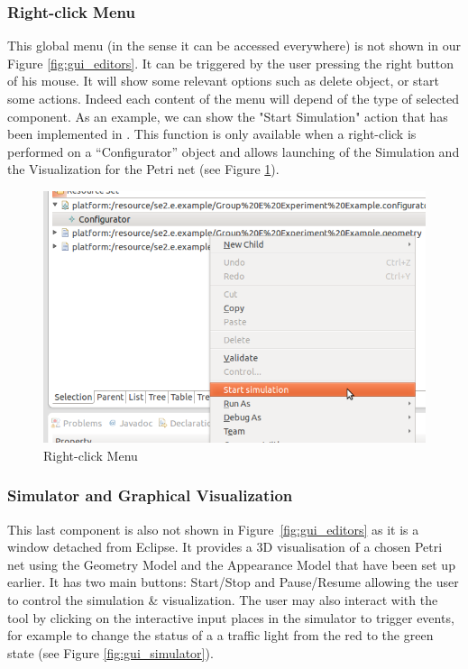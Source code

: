 \subsubsection{Right-click Menu}
This global menu (in the sense it can be accessed everywhere) is not shown in our Figure \ref{fig:gui_editors}. It can be triggered by the user pressing the right button of his mouse. It will show some relevant options such as delete object, or start some actions. Indeed each content of the menu will depend of the type of selected component. As an example, we can show the "Start Simulation" action that has been implemented in \epns. This function is only available when a right-click is performed on a ``Configurator'' object and allows launching of the Simulation and the Visualization for the Petri net  (see Figure \ref{fig:gui_popup_menu}).

\begin{figure}[htp]
\begin{center}
  \includegraphics[scale=0.40]{image/gui_popup_menu.png}
  \caption{Right-click Menu}
  \label{fig:gui_popup_menu}
\end{center}
\end{figure}

\subsubsection{Simulator and Graphical Visualization}
This last component is also not shown in Figure~\ref{fig:gui_editors} as it is a window detached
from Eclipse. It provides a 3D visualisation of a chosen Petri net using the Geometry Model and the
Appearance Model that have been set up earlier. It has two main buttons: Start/Stop and Pause/Resume
allowing the user to control the simulation \& visualization. The user may also interact with the
tool by clicking on the interactive input places in the simulator to trigger events, for example to
change the status of a a traffic light from the red to the green state (see Figure
\ref{fig:gui_simulator}).

